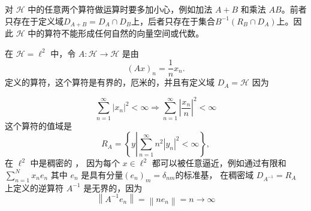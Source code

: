 对 \(\mathcal{H}\) 中的任意两个算符做运算时要多加小心，例如加法 \(A+B\) 和乘法 \(A B\)。前者只存在于定义域\(D_{A+B}=D_{A}\cap D_{B}\)上，后者只存在于集合\(B^{-1}\left(R_{ B} \cap D_{A}\right)\)上。因此 \(\mathcal{H}\) 中的算符不能形成任何自然的向量空间或代数。
\begin{eg}\label{eg:13.16}
    在 \(\mathcal{H}=\ell^{2}\) 中，令 \(A: \mathcal{H} \rightarrow \mathcal{H}\) 是由
\[
(A x)_{n}=\frac{1}{n} x_{n} .
\]
定义的算符，这个算符是有界的，厄米的，并且有定义域 \(D_{A}=\mathcal{H}\) 因为

\[
\sum_{n=1}^{\infty}\left|x_{n}\right|^{2}<\infty \Longrightarrow \sum_{n=1}^{\infty}\left|\frac{x_{n}}{n}\right|^{2}<\infty
\]
这个算符的值域是
\[
R_{A}=\left\{y\left|\sum_{n=1}^{\infty} n^{2}| y_{n}|^{2}<\infty\right.\right\},
\]
在 \(\ell^{2}\) 中是稠密的 ， 因为每个 \(x \in \ell^{2}\) 都可以被任意逼近，例如通过有限和\(\sum_{n=1}^{N} x_{n} e_{n}\) 其中 \(e_{n}\) 是具有分量\(\left(e_{n}\right)_{m}=\delta_{n m}\)的标准基，
在稠密域 \(D_{A^{-1}}=R_{A}\) 上定义的逆算符 \(A^{-1}\) 是无界的，因为
\[
\left\|A^{-1} e_{n}\right\|=\left\|n e_{n}\right\|=n \rightarrow \infty
\]    
\end{eg}
